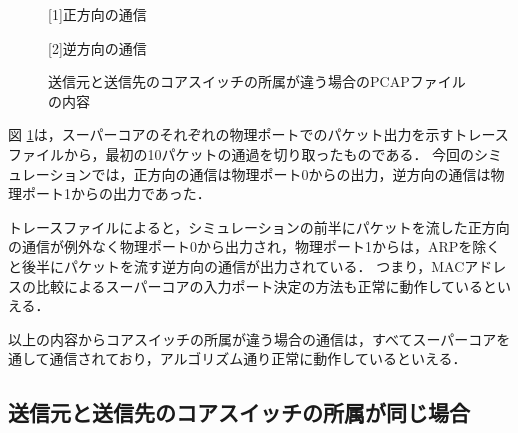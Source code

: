 \begin{figure}[tb]
	\begin{center}
		
		\begin{center}
			\hspace{1.6cm} [1]正方向の通信
		\end{center}
		
		\begin{center}
			\hspace{1.6cm} [2]逆方向の通信
		\end{center}
		\caption{送信元と送信先のコアスイッチの所属が違う場合のPCAPファイルの内容}
		\label{fig:4-3}
	\end{center}
\end{figure}

図 \ref{fig:4-3}は，スーパーコアのそれぞれの物理ポートでのパケット出力を示すトレースファイルから，最初の10パケットの通過を切り取ったものである．
今回のシミュレーションでは，正方向の通信は物理ポート0からの出力，逆方向の通信は物理ポート1からの出力であった．

トレースファイルによると，シミュレーションの前半にパケットを流した正方向の通信が例外なく物理ポート0から出力され，物理ポート1からは，ARPを除くと後半にパケットを流す逆方向の通信が出力されている．
つまり，MACアドレスの比較によるスーパーコアの入力ポート決定の方法も正常に動作しているといえる．

以上の内容からコアスイッチの所属が違う場合の通信は，すべてスーパーコアを通して通信されており，アルゴリズム通り正常に動作しているといえる．

\subsection{送信元と送信先のコアスイッチの所属が同じ場合}

